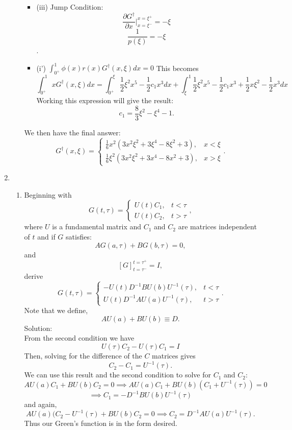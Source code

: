 \documentclass[12pt]{article}
\numberwithin{equation}{section}
\begin{document}
\begin{enumerate}
\begin{enumerate}
\begin{itemize}
    \item (iii) Jump Condition:
    $$\frac{\partial G^\dag}{\partial x}|_{x=\xi^-}^{x=\xi^+}=-\xi$$
    $$\frac{1}{p(\xi)}=-\xi$$.

    \item (i') $\int_{0^+}^1 \phi(x)r(x)G^\dag(x,\xi)dx=0$
    This becomes
    $$\int_{0^+}^1 x G^\dag(x,\xi)dx=\int_{0^+}^\xi \frac{1}{2}\xi^2 x^5-\frac{1}{2}c_1 x^3dx+\int_\xi^1 \frac{1}{2}\xi^2 x^5-\frac{1}{2}c_1 x^3+\frac{1}{2}x\xi^2-\frac{1}{2}x^3dx$$
    Working this expression will give the result:
    $$c_1=\frac{8}{3}\xi^2-\xi^4-1.$$
    \end{itemize}
    We then have the final answer:
    $$G^\dag(x,\xi)=\left\{\begin{array}{cc}\frac{1}{6}x^2(3x^2\xi^2+3\xi^4-8\xi^2+3),&x<\xi\\ \frac{1}{6}\xi^2(3x^2\xi^2+3x^4-8x^2+3), &x>\xi\end{array}\right..$$
    \end{enumerate}

    \item \begin{enumerate} \item Beginning with
    $$G(t,\tau)=\left\{\begin{array}{cc}U(t)C_1, &t<\tau\\U(t)C_2,&t>\tau\end{array}\right.,$$
    where $U$ is a fundamental matrix and $C_1$ and $C_2$ are matrices independent of $t$ and if $G$ satisfies:
    $$AG(a,\tau)+BG(b,\tau)=0,$$
    and
    $$[G]_{t=\tau^-}^{t=\tau^+}=I,$$
    derive
    $$G(t,\tau)=\left\{\begin{array}{cc}-U(t)D^{-1}BU(b)U^{-1}(\tau),&t<\tau\\U(t)D^{-1}AU(a)U^{-1}(\tau),&t>\tau\end{array}\right..$$
    Note that we define,
    $$AU(a)+BU(b)\equiv D.$$
    Solution:\\
    From the second condition we have
    $$U(\tau)C_2-U(\tau)C_1=I$$
    Then, solving for the difference of the $C$ matrices gives
    $$C_2-C_1=U^{-1}(\tau).$$
    We can use this result and the second condition to solve for $C_1$ and $C_2$:
    $$AU(a)C_1+BU(b)C_2=0\implies AU(a)C_1+BU(b)(C_1+U^{-1}(\tau))=0$$
    $$\implies C_1=-D^{-1}BU(b)U^{-1}(\tau)$$
    and again,
    $$AU(a)(C_2-U^{-1}(\tau)+BU(b)C_2=0\implies C_2=D^{-1}AU(a)U^{-1}(\tau).$$
    Thus our Green's function is in the form desired.


\end{enumerate}
\end{enumerate}
\end{document}
